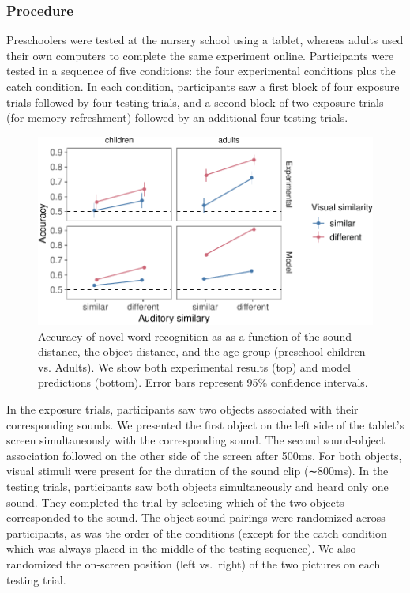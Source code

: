 \documentclass[10pt, letterpaper]{article}
\newenvironment{CodeChunk}{}{}
\begin{document}
\subsubsection{Procedure}\label{procedure}

Preschoolers were tested at the nursery school using a tablet, whereas
adults used their own computers to complete the same experiment online.
Participants were tested in a sequence of five conditions: the four
experimental conditions plus the catch condition. In each condition,
participants saw a first block of four exposure trials followed by four
testing trials, and a second block of two exposure trials (for memory
refreshment) followed by an additional four testing trials.

\begin{CodeChunk}
\begin{figure}[h]

{\centering \includegraphics{figs/all_data-1} 

}

\caption{\label{fig:data_all}Accuracy of novel word recognition as as a function of the sound distance, the object distance, and the age group (preschool children vs. Adults). We show both experimental results (top) and model predictions (bottom). Error bars represent 95\% confidence intervals.}\label{fig:all_data}
\end{figure}
\end{CodeChunk}

In the exposure trials, participants saw two objects associated with
their corresponding sounds. We presented the first object on the left
side of the tablet's screen simultaneously with the corresponding sound.
The second sound-object association followed on the other side of the
screen after 500ms. For both objects, visual stimuli were present for
the duration of the sound clip (∼800ms). In the testing trials,
participants saw both objects simultaneously and heard only one sound.
They completed the trial by selecting which of the two objects
corresponded to the sound. The object-sound pairings were randomized
across participants, as was the order of the conditions (except for the
catch condition which was always placed in the middle of the testing
sequence). We also randomized the on-screen position (left vs.~right) of
the two pictures on each testing trial.
\end{document}
